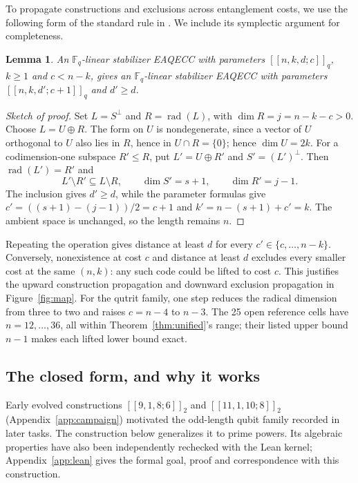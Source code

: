 \documentclass{article}
\newtheorem{lemma}{Lemma}
\newcommand{\F}{\mathbb{F}}
\begin{document}
To propagate constructions and exclusions across entanglement costs,
we use the following form of the standard rule in
\citet[Section IV, rule (4)]{Luo2022}. We include its symplectic argument
for completeness.

\begin{lemma}\label{app:lifting}
An $\F_q$-linear stabilizer EAQECC with parameters $[[n,k,d;c]]_q$,
$k\ge1$ and $c<n-k$, gives an $\F_q$-linear stabilizer EAQECC with
parameters $[[n,k,d';c+1]]_q$ and $d'\ge d$.
\end{lemma}
\begin{proof}[Sketch of proof]
Set $L=S^\perp$ and $R=\operatorname{rad}(L)$, with $\dim R=j=n-k-c>0$.
Choose $L=U\oplus R$. The form on $U$ is nondegenerate, since a
vector of $U$ orthogonal to $U$ also lies in $R$, hence in $U\cap R=\{0\}$; hence $\dim U=2k$.
For a codimension-one subspace $R'\le R$, put $L'=U\oplus R'$ and
$S'=(L')^\perp$. Then $\operatorname{rad}(L')=R'$ and
\[
 L'\setminus R'\subseteq L\setminus R,
 \qquad \dim S'=s+1,\qquad \dim R'=j-1.
\]
The inclusion gives $d'\ge d$, while the parameter formulas give
$c'=((s+1)-(j-1))/2=c+1$ and $k'=n-(s+1)+c'=k$.
The ambient space is unchanged, so the length remains $n$.
\end{proof}
Repeating the operation gives distance at least $d$ for every
$c'\in\{c,\ldots,n-k\}$. Conversely, nonexistence at cost $c$ and
distance at least $d$ excludes every smaller cost at the same $(n,k)$:
any such code could be lifted to cost $c$. This justifies the upward
construction propagation and downward exclusion propagation in
Figure~\ref{fig:map}. For the qutrit family, one step reduces the radical
dimension from three to two and raises $c=n-4$ to $n-3$. The 25 open
reference cells have $n=12,\ldots,36$, all within Theorem~\ref{thm:unified}'s
range; their listed upper bound $n-1$ makes each lifted lower bound exact.

\subsection{The closed form, and why it works}\label{app:theorem}
Early evolved constructions $[[9,1,8;6]]_2$ and $[[11,1,10;8]]_2$
(Appendix~\ref{app:campaign}) motivated the odd-length qubit family
recorded in later tasks. The construction below generalizes it to prime
powers. Its algebraic properties have also been independently rechecked
with the Lean kernel; Appendix~\ref{app:lean} gives the formal goal,
proof and correspondence with this construction.
\end{document}
